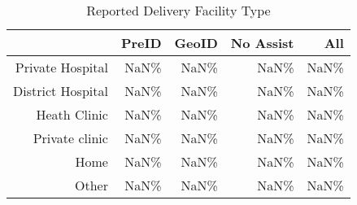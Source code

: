 \begin{table}[ht]
\centering
\begin{tabular}{rrrrr}
  \hline
 & PreID & GeoID & No Assist & All \\ 
  \hline
Private Hospital & NaN\% & NaN\% & NaN\% & NaN\% \\ 
  District Hospital & NaN\% & NaN\% & NaN\% & NaN\% \\ 
  Heath Clinic & NaN\% & NaN\% & NaN\% & NaN\% \\ 
  Private clinic & NaN\% & NaN\% & NaN\% & NaN\% \\ 
  Home & NaN\% & NaN\% & NaN\% & NaN\% \\ 
  Other & NaN\% & NaN\% & NaN\% & NaN\% \\ 
   \hline
\end{tabular}
\caption{Reported Delivery Facility Type} 
\end{table}
